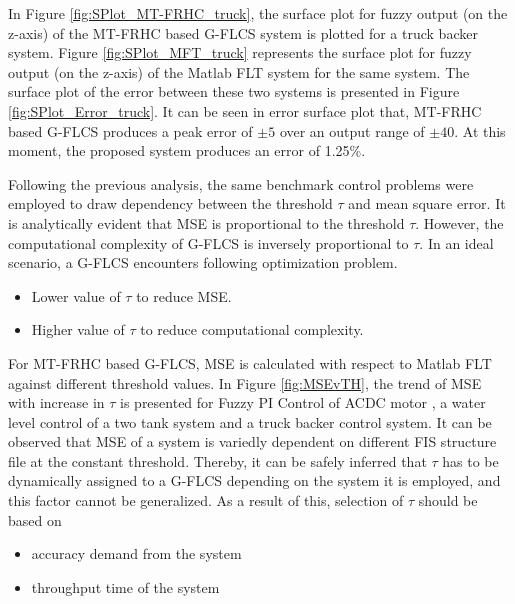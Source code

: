 In Figure \ref{fig:SPlot_MT-FRHC_truck}, the surface plot for fuzzy output (on the z-axis) of the MT-FRHC based G-FLCS system is plotted for a truck backer system. Figure \ref{fig:SPlot_MFT_truck} represents the surface plot for fuzzy output (on the z-axis) of the Matlab FLT system for the same system. The surface plot of the error between these two systems is presented in Figure \ref{fig:SPlot_Error_truck}. It can be seen in error surface plot that, MT-FRHC based G-FLCS produces a peak error of $ \pm 5 $ over an output range of $ \pm 40 $. At this moment, the proposed system produces an error of 1.25\%.

Following the previous analysis, the same benchmark control problems were employed to draw dependency between the threshold $ \tau $ and mean square error.
It is analytically evident that MSE is proportional to the threshold $ \tau $. However, the computational complexity of G-FLCS is inversely proportional to $ \tau $. In an ideal scenario, a G-FLCS encounters following optimization problem.
\begin{itemize}
	\item Lower value of $ \tau $ to reduce MSE.
	\item Higher value of $ \tau $ to reduce computational complexity.
\end{itemize}
For MT-FRHC based G-FLCS, MSE is calculated with respect to Matlab FLT against different threshold values. In Figure \ref{fig:MSEvTH}, the trend of MSE with increase in $\tau$ is presented for Fuzzy PI Control of ACDC motor \cite{malla2012}, a water level control of a two tank system \cite{twotank2012} and a truck backer control system\cite{Passino2010}. It can be observed that MSE of a system is variedly dependent on different FIS structure file at the constant threshold. Thereby, it can be safely inferred that $\tau$ has to be dynamically assigned to a G-FLCS depending on the system it is employed, and this factor cannot be generalized. As a result of this, selection of $\tau$ should be based on
\begin{itemize}
	\item accuracy demand from the system
	\item throughput time of the system
\end{itemize}

